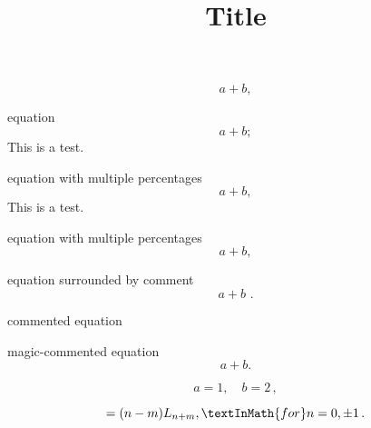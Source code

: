 \documentclass[12pt]{article}
\title{Title}
\author{}
\date{}
\begin{document}


\begin{equation}
  a+b
  ,
\end{equation}


equation
\begin{equation}
  a+b    ;
\end{equation}
This is a test.


equation with multiple percentages
%
%
\begin{equation}
  a+b,
\end{equation}
%
This is a test.

equation with multiple percentages
%
%
\begin{equation}
  a+b  ,
\end{equation}
%
%


equation surrounded by comment
%
\begin{equation}
  a+b 
  \,\, .
\end{equation}
%


commented equation


magic-commented equation
\begin{equation}
    a+b.
\end{equation}


\begin{equation}
    a=1, 
    \quad b=2
    \, ,
\end{equation}


\begin{equation}
    [L_n,L_m]=(n-m)L_{n+m}
    ,
    \textInMath{for}
    n=0,\pm 1
    \, .
\end{equation}
\end{document}
